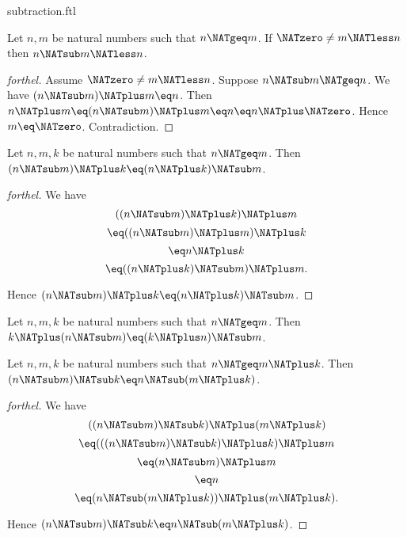 \documentclass{stex}
\begin{document}
\begin{smodule}{subtraction.ftl}
\begin{proposition}[forthel,id=ARITHMETIC_05_1269537257291776]
  Let $n, m$ be natural numbers such that $n \NATgeq m$.
  If $\NATzero \neq m \NATless n$ then $n \NATsub m \NATless n$.
\end{proposition}
\begin{proof}[forthel]
  Assume $\NATzero \neq m \NATless n$.
  Suppose $n \NATsub m \NATgeq n$.
  We have $(n \NATsub m) \NATplus m \eq n$.
  Then $n \NATplus m
    \eq (n \NATsub m) \NATplus m
    \eq n
    \eq n \NATplus \NATzero$.
  Hence $m \eq \NATzero$.
  Contradiction.
\end{proof}

\begin{proposition}[forthel,id=ARITHMETIC_05_4767595811045376]
  Let $n, m, k$ be natural numbers such that $n \NATgeq m$.
  Then $(n \NATsub m) \NATplus k \eq (n \NATplus k) \NATsub m$.
\end{proposition}
\begin{proof}[forthel]
  We have
  \[  ((n \NATsub m) \NATplus k) \NATplus m       \]
  \[    \eq ((n \NATsub m) \NATplus m) \NATplus k   \]
  \[    \eq n \NATplus k               \]
  \[    \eq ((n \NATplus k) \NATsub m) \NATplus m.  \]

  Hence $(n \NATsub m) \NATplus k \eq (n \NATplus k) \NATsub m$.
\end{proof}

\begin{corollary}[forthel,id=ARITHMETIC_05_7578468875239424]
  Let $n, m, k$ be natural numbers such that $n \NATgeq m$.
  Then $k \NATplus (n \NATsub m) \eq (k \NATplus n) \NATsub m$.
\end{corollary}

\begin{proposition}[forthel,id=ARITHMETIC_05_7595909347016704]
  Let $n, m, k$ be natural numbers such that $n \NATgeq  m \NATplus k$.
  Then $(n \NATsub m) \NATsub k \eq n \NATsub (m \NATplus k)$.
\end{proposition}
\begin{proof}[forthel]
  We have
  \[  ((n \NATsub m) \NATsub k) \NATplus (m \NATplus k)       \]
  \[    \eq (((n \NATsub m) \NATsub k) \NATplus k) \NATplus m   \]
  \[    \eq (n \NATsub m) \NATplus m               \]
  \[    \eq n                         \]
  \[    \eq (n \NATsub (m \NATplus k)) \NATplus (m \NATplus k).  \]

  Hence $(n \NATsub m) \NATsub k \eq n \NATsub (m \NATplus k)$.
\end{proof}
\end{smodule}
\end{document}
